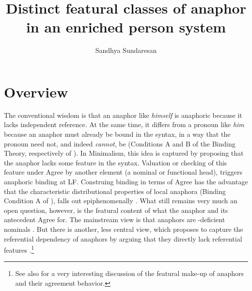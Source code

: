 \documentclass[output=paper, modfonts, nonflat]{langsci/langscibook}
\title{Distinct featural classes of anaphor in an enriched person system}
\author{Sandhya Sundaresan\affiliation{Universität Leipzig}}
\begin{document}
\maketitle

\section{Overview}

The conventional wisdom is that an anaphor like \textit{himself} is
anaphoric because it lacks independent reference. At the same time, it
differs from a pronoun like \textit{him} because an anaphor must already be
bound in the syntax, in a way that the pronoun need not, and indeed
\textit{cannot}, be (Conditions A and B of the Binding Theory,
respectively of \citealt{Chomsky:1981}).  In Minimalism, this idea is
captured by proposing that the anaphor lacks some feature in the
syntax. Valuation or checking of this feature under Agree by another
element (a nominal or functional head), triggers anaphoric binding at
LF. Construing binding in terms of Agree has the advantage that the
characteristic distributional properties of local anaphora (Binding
Condition A of \citealt{Chomsky:1981}), falls out epiphenomenally
\citep{Hicks:2009}. What still remains very much an open question,
however, is the featural content of what the anaphor and its
antecedent Agree for. The mainstream view is that anaphors are
\ph-deficient nominals \citep{heinat:2008, kratzer:2009, reuland:2001,
  Reuland:2011, roorwyn:2011}. But there is another, less central
view, which proposes to capture the referential dependency of anaphors
by arguing that they directly lack referential features
\citep{adgerramchand:2005, Hicks:2009}.\footnote{See also  
for a very interesting discussion of the featural make-up of anaphors and their agreement behavior.}
\end{document}
